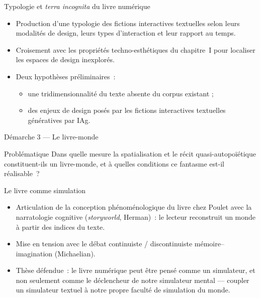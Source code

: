 \documentclass[xcolor=monochrome,11pt]{beamer}
\begin{document}
\begin{frame}{Typologie et \emph{terra incognita} du livre numérique}
  \footnotesize
  \begin{itemize}
    \item Production d'une typologie des fictions interactives textuelles
      selon leurs modalités de design, leurs types d'interaction et leur
      rapport au temps.
    \item Croisement avec les propriétés techno-esthétiques du chapitre~I
      pour localiser les espaces de design inexplorés.
    \item Deux hypothèses préliminaires~:
      \begin{itemize}
        \item une tridimensionnalité du texte absente du corpus existant ;
        \item des enjeux de design posés par les fictions interactives
          textuelles génératives par IAg.
      \end{itemize}
  \end{itemize}
\end{frame}

\begin{frame}{Démarche 3 --- Le livre-monde}
  \begin{block}{Problématique}
    \small Dans quelle mesure la spatialisation et le récit
    quasi-autopoïétique constituent-ils un livre-monde, et à quelles
    conditions ce fantasme est-il réalisable~?
  \end{block}
\end{frame}

\begin{frame}{Le livre comme simulation}
  \footnotesize
  \begin{itemize}
    \item Articulation de la conception phénoménologique du livre chez
      Poulet avec la narratologie cognitive (\emph{storyworld}, Herman)~:
      le lecteur reconstruit un monde à partir des indices du texte.
    \item Mise en tension avec le débat continuiste / discontinuiste
      mémoire--imagination (Michaelian).
    \item Thèse défendue~: le livre numérique peut être pensé comme un
      simulateur, et non seulement comme le déclencheur de notre
      simulateur mental --- coupler un simulateur textuel à notre propre
      faculté de simulation du monde.
  \end{itemize}
\end{frame}
\end{document}
